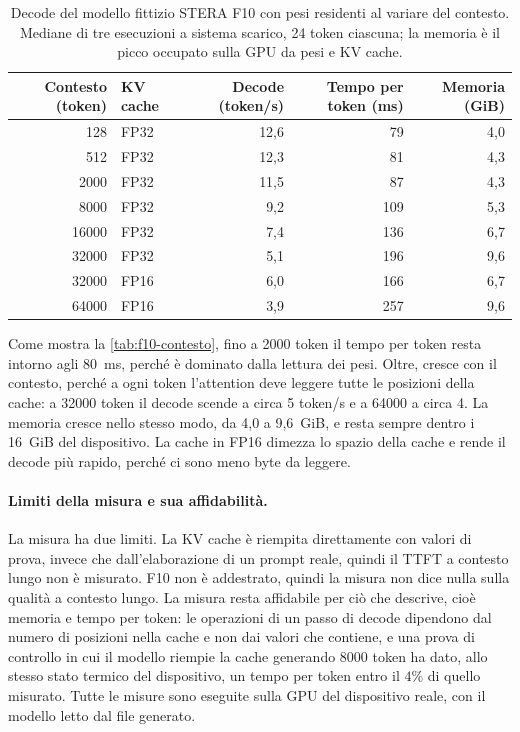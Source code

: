 \begin{table}[H]
\centering
\small
\begin{tabular}{rlrrr}
\toprule
Contesto (token) & KV cache & Decode (token/s) & Tempo per token (ms) & Memoria (GiB) \\
\midrule
128 & FP32 & 12,6 & 79 & 4,0 \\
512 & FP32 & 12,3 & 81 & 4,3 \\
\num{2000} & FP32 & 11,5 & 87 & 4,3 \\
\num{8000} & FP32 & 9,2 & 109 & 5,3 \\
\num{16000} & FP32 & 7,4 & 136 & 6,7 \\
\num{32000} & FP32 & 5,1 & 196 & 9,6 \\
\num{32000} & FP16 & 6,0 & 166 & 6,7 \\
\num{64000} & FP16 & 3,9 & 257 & 9,6 \\
\bottomrule
\end{tabular}
\caption{Decode del modello fittizio STERA F10 con pesi residenti al variare del contesto. Mediane di tre esecuzioni a sistema scarico, 24 token ciascuna; la memoria è il picco occupato sulla GPU da pesi e KV cache.}
\label{tab:f10-contesto}
\end{table}

Come mostra la \autoref{tab:f10-contesto}, fino a \num{2000} token il tempo per token resta intorno agli 80~ms, perché è dominato dalla lettura dei pesi. Oltre, cresce con il contesto, perché a ogni token l'attention deve leggere tutte le posizioni della cache: a \num{32000} token il decode scende a circa 5 token/s e a \num{64000} a circa 4. La memoria cresce nello stesso modo, da 4,0 a 9,6~GiB, e resta sempre dentro i 16~GiB del dispositivo. La cache in FP16 dimezza lo spazio della cache e rende il decode più rapido, perché ci sono meno byte da leggere.

\paragraph{Limiti della misura e sua affidabilità.} La misura ha due limiti. La KV cache è riempita direttamente con valori di prova, invece che dall'elaborazione di un prompt reale, quindi il TTFT a contesto lungo non è misurato. F10 non è addestrato, quindi la misura non dice nulla sulla qualità a contesto lungo. La misura resta affidabile per ciò che descrive, cioè memoria e tempo per token: le operazioni di un passo di decode dipendono dal numero di posizioni nella cache e non dai valori che contiene, e una prova di controllo in cui il modello riempie la cache generando \num{8000} token ha dato, allo stesso stato termico del dispositivo, un tempo per token entro il $4\%$ di quello misurato. Tutte le misure sono eseguite sulla GPU del dispositivo reale, con il modello letto dal file generato.

